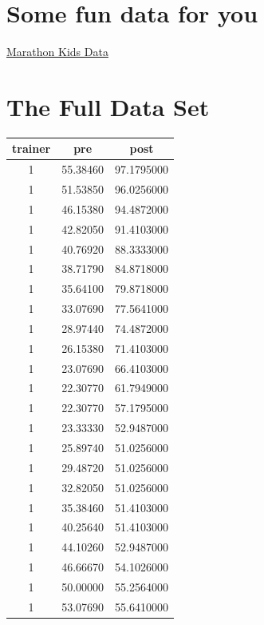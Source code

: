 \documentclass[
]{book}
\begin{document}
\hypertarget{some-fun-data-for-you}{%
\section{Some fun data for you}\label{some-fun-data-for-you}}

\href{https://drive.google.com/drive/folders/1ZytY6Co6NS0UdTS9cZIAsNjbEcdtkYte?usp=sharing}{Marathon Kids Data}

\hypertarget{the-full-data-set}{%
\section{The Full Data Set}\label{the-full-data-set}}

\begin{tabular}{c|c|c}
\hline
trainer & pre & post\\
\hline
1 & 55.38460 & 97.1795000\\
\hline
1 & 51.53850 & 96.0256000\\
\hline
1 & 46.15380 & 94.4872000\\
\hline
1 & 42.82050 & 91.4103000\\
\hline
1 & 40.76920 & 88.3333000\\
\hline
1 & 38.71790 & 84.8718000\\
\hline
1 & 35.64100 & 79.8718000\\
\hline
1 & 33.07690 & 77.5641000\\
\hline
1 & 28.97440 & 74.4872000\\
\hline
1 & 26.15380 & 71.4103000\\
\hline
1 & 23.07690 & 66.4103000\\
\hline
1 & 22.30770 & 61.7949000\\
\hline
1 & 22.30770 & 57.1795000\\
\hline
1 & 23.33330 & 52.9487000\\
\hline
1 & 25.89740 & 51.0256000\\
\hline
1 & 29.48720 & 51.0256000\\
\hline
1 & 32.82050 & 51.0256000\\
\hline
1 & 35.38460 & 51.4103000\\
\hline
1 & 40.25640 & 51.4103000\\
\hline
1 & 44.10260 & 52.9487000\\
\hline
1 & 46.66670 & 54.1026000\\
\hline
1 & 50.00000 & 55.2564000\\
\hline
1 & 53.07690 & 55.6410000\\

\end{tabular}
\end{document}
